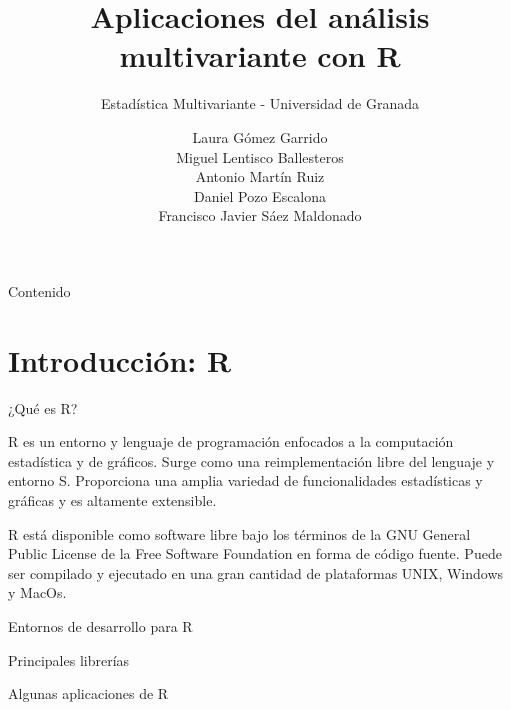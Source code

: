 \documentclass[xcolor=table]{beamer}
\title{Aplicaciones del análisis multivariante con R}
\subtitle{Estadística Multivariante - Universidad de Granada}
\author{Laura Gómez Garrido\\ Miguel Lentisco Ballesteros \\ Antonio Martín Ruiz \\ Daniel Pozo Escalona \\Francisco Javier Sáez Maldonado}
\begin{document}
\begin{frame}
\titlepage
\end{frame}
\begin{frame}{Contenido}
  \tableofcontents
\end{frame}
\section{Introducción: R}

\begin{frame}{¿Qué es R?}

R es un entorno y lenguaje de programación enfocados a la computación
estadística y de gráficos. Surge como una reimplementación libre del lenguaje y
entorno S. Proporciona una amplia variedad de funcionalidades estadísticas y
gráficas y es altamente extensible.

\end{frame}

\begin{frame}
  
R está disponible como software libre bajo los términos de la GNU General Public
License de la Free Software Foundation en forma de código fuente. Puede ser
compilado y ejecutado en una gran cantidad de plataformas UNIX, Windows y MacOs.

\end{frame}

\begin{frame}{Entornos de desarrollo para R}
\end{frame}

\begin{frame}{Principales librerías}

\end{frame}

\begin{frame}{Algunas aplicaciones de R}
\end{frame}
\end{document}
